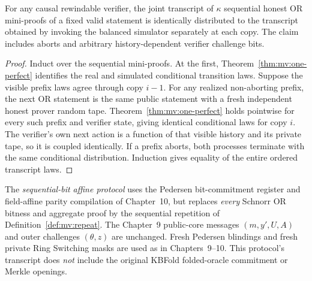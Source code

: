 \begin{theorem}\label{thm:mv:repeat-perfect}
For any causal rewindable verifier, the
joint transcript of $\kappa$ sequential
honest OR mini-proofs of a fixed valid
statement is identically distributed to
the transcript obtained by invoking the
balanced simulator separately at each copy.
The claim includes aborts and arbitrary
history-dependent verifier challenge bits.
\end{theorem}
\begin{proof}
Induct over the sequential mini-proofs.
At the first, Theorem~\ref{thm:mv:one-perfect}
identifies the real and simulated
conditional transition laws.
Suppose the visible prefix laws agree
through copy $i-1$.
For any realized non-aborting prefix,
the next OR statement is the same public
statement with a fresh independent
honest prover random tape.
Theorem~\ref{thm:mv:one-perfect}
holds pointwise for every such prefix
and verifier state, giving identical
conditional laws for copy $i$.
The verifier's own next action is
a function of that visible history
and its private tape, so it is
coupled identically. If a prefix
aborts, both processes terminate
with the same conditional distribution.
Induction gives equality of the
entire ordered transcript laws.
\end{proof}

\begin{definition}\label{def:mv:affine-protocol}
The \emph{sequential-bit affine protocol}
uses the Pedersen bit-commitment register
and field-affine parity compilation of
Chapter~10, but replaces \emph{every}
Schnorr OR bitness and aggregate proof
by the sequential repetition of
Definition~\ref{def:mv:repeat}.
The Chapter~9 public-core messages
$(m,y',U,A)$ and outer challenges
$(\theta,z)$ are unchanged.
Fresh Pedersen blindings and fresh
private Ring Switching masks are used
as in Chapters~9--10.
This protocol's transcript does
\emph{not} include the original
KBFold folded-oracle commitment or
Merkle openings.
\end{definition}

